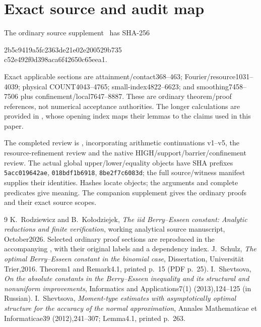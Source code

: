 \documentclass[11pt,a4paper]{article}
\begin{document}
\section{Exact source and audit map}
The ordinary source supplement~\cite{source} has SHA-256
\begin{center}\footnotesize\ttfamily
2b5c9419a5fc2363de21e02e200529b735\\c52e492f0d398aca6f42650c65eea1.
\end{center}
Exact applicable sections are attainment/contact368--463;
Fourier/resource1031--4039; physical COUNT4043--4765; small-index4822--6623;
and smoothing7458--7506 plus confinement/local7647--8887. These are ordinary theorem/proof
references, not numerical acceptance authorities. The longer calculations are provided in ,
whose opening index maps their lemmas to the claims used in this paper.

The completed review is
, incorporating
arithmetic continuations v1--v5, the resource-refinement review and the native
HIGH/support/barrier/confinement review. The actual global upper/lower/equality
objects have SHA prefixes \texttt{5acc019642ae}, \texttt{018bdf1b6918},
\texttt{8be2f7c6083d}; the full source/witness manifest supplies their identities.
Hashes locate objects; the arguments and complete predicates give meaning.
The companion supplement gives the ordinary proofs and their exact source scopes.

\begin{thebibliography}{9}
K.~Rodziewicz and B.~Ko{\l}odziejek,
\emph{The iid Berry--Esseen constant: Analytic reductions and finite
verification}, working analytical source manuscript, October2026.
Selected ordinary proof sections are reproduced in the accompanying
, with their original labels and a dependency index.
J.~Schulz, \emph{The optimal Berry--Esseen constant in the binomial case},
Dissertation, Universit\"at Trier,2016. Theorem1 and Remark4.1,
printed p.~15 (PDF p.~25).
I.~Shevtsova, \emph{On the absolute constants in the Berry--Esseen inequality
and its structural and nonuniform improvements},
Informatics and Applications7(1) (2013),124--125 (in Russian).
I.~Shevtsova, \emph{Moment-type estimates with asymptotically optimal
structure for the accuracy of the normal approximation},
Annales Mathematicae et Informaticae39 (2012),241--307;
Lemma4.1, printed p.~263.
\end{thebibliography}
\end{document}
